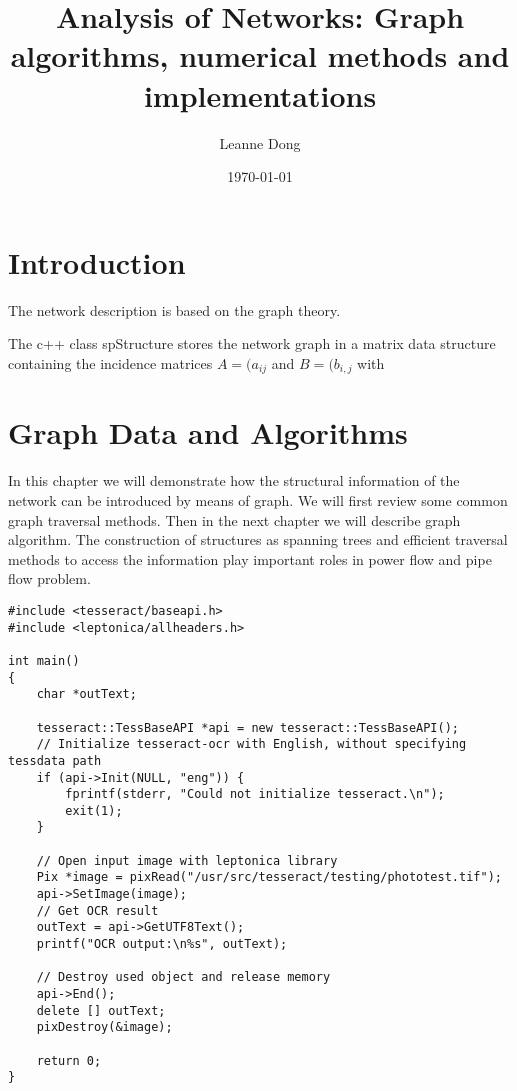 \documentclass[11pt, oneside, reqno]{amsart}
\title{Analysis of Networks: Graph algorithms, numerical methods and implementations
}
\author{Leanne Dong}
\date{\today}
\numberwithin{equation}{section}
\theoremstyle{plain}%
\theoremstyle{definition}
\theoremstyle{remark}
\begin{document}
	\maketitle

\section{Introduction}

The network description is based on the graph theory. 

The c++ class spStructure stores the network graph in a matrix data structure containing the incidence matrices $A=(a_{ij}$
and $B=(b_{i,j}$ with 

\section{Graph Data and Algorithms}

In this chapter we will demonstrate how the structural information of the network can be introduced by means of graph. 
We will first review some common graph traversal methods. Then in the next chapter we will describe graph algorithm. The construction of structures as spanning trees and efficient traversal methods to access the information play important roles in power flow and pipe flow problem.

\begin{verbatim}
#include <tesseract/baseapi.h>
#include <leptonica/allheaders.h>

int main()
{
    char *outText;

    tesseract::TessBaseAPI *api = new tesseract::TessBaseAPI();
    // Initialize tesseract-ocr with English, without specifying tessdata path
    if (api->Init(NULL, "eng")) {
        fprintf(stderr, "Could not initialize tesseract.\n");
        exit(1);
    }

    // Open input image with leptonica library
    Pix *image = pixRead("/usr/src/tesseract/testing/phototest.tif");
    api->SetImage(image);
    // Get OCR result
    outText = api->GetUTF8Text();
    printf("OCR output:\n%s", outText);

    // Destroy used object and release memory
    api->End();
    delete [] outText;
    pixDestroy(&image);

    return 0;
}
\end{verbatim}
\end{document}
